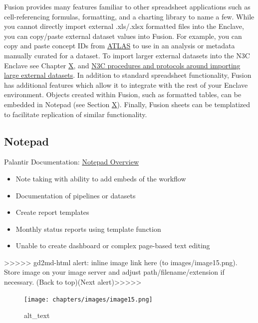 \documentclass[
  letterpaper,
  DIV=11,
  numbers=noendperiod]{scrreprt}
\providecommand{\tightlist}{%
  \setlength{\itemsep}{0pt}\setlength{\parskip}{0pt}}\usepackage{longtable,booktabs,array}
\begin{document}
Fusion provides many features familiar to other spreadsheet applications
such as cell-referencing formulas, formatting, and a charting library to
name a few. While you cannot directly import external .xls/.xlsx
formatted files into the Enclave, you can copy/paste external dataset
values into Fusion. For example, you can copy and paste concept IDs from
\href{https://ohdsi.github.io/TheBookOfOhdsi/OhdsiAnalyticsTools.html\#atlas}{ATLAS}
to use in an analysis or metadata manually curated for a dataset. To
import larger external datasets into the N3C Enclave see Chapter
\protect\hyperlink{Chapterux5cux2520onux5cux2520externalux5cux2520datasets}{X},
and \href{https://zenodo.org/record/4574608\#.Y6IeG-zMJTZ}{N3C
procedures and protocols around importing large external datasets}. In
addition to standard spreadsheet functionality, Fusion has additional
features which allow it to integrate with the rest of your Enclave
environment. Objects created within Fusion, such as formatted tables,
can be embedded in Notepad (see Section \protect\hyperlink{Notepad}{X}).
Finally, Fusion sheets can be templatized to facilitate replication of
similar functionality.

\hypertarget{notepad}{%
\subsection{Notepad}\label{notepad}}

Palantir Documentation:
\href{https://www.palantir.com/docs/foundry/notepad/overview/}{Notepad
Overview}

\begin{itemize}
\tightlist
\item
  Note taking with ability to add embeds of the workflow
\item
  Documentation of pipelines or datasets
\item
  Create report templates
\item
  Monthly status reports using template function
\item
  Unable to create dashboard or complex page-based text editing
\end{itemize}

{\textgreater\textgreater\textgreater\textgreater\textgreater{}
gd2md-html alert: inline image link here (to images/image15.png). Store
image on your image server and adjust path/filename/extension if
necessary. }(Back to top)(Next
alert){\textgreater\textgreater\textgreater\textgreater\textgreater{} }

\begin{figure}

{\centering \texttt{[image: chapters/images/image15.png]}

}

\caption{alt\_text}

\end{figure}
\end{document}
